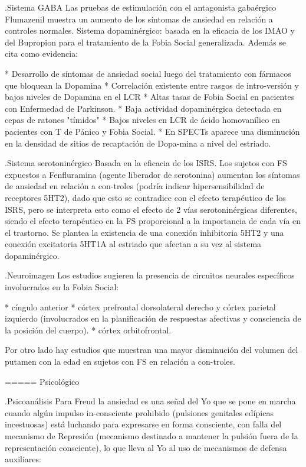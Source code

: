 \documentclass{scrbook}
\begin{document}
.Sistema GABA
Las pruebas de estimulación con el antagonista gabaérgico Flumazenil muestra un aumento de los síntomas de ansiedad en relación a controles normales. Sistema dopaminérgico: basada en la eficacia de los IMAO y del Bupropion para el tratamiento de la Fobia Social generalizada. Además se cita como evidencia:

* Desarrollo de síntomas de ansiedad social luego del tratamiento con fármacos que bloquean la Dopamina
* Correlación existente entre rasgos de intro-versión y bajos niveles de Dopamina en el LCR
* Altas tasas de Fobia Social en pacientes con Enfermedad de Parkinson.
* Baja actividad dopaminérgica detectada en cepas de ratones "tímidos"
* Bajos niveles en LCR de ácido homovanílico en pacientes con T de Pánico y Fobia Social.
* En SPECTs aparece una disminución en la densidad de sitios de recaptación de Dopa-mina a nivel del estriado.

.Sistema serotoninérgico
Basada en la eficacia de los ISRS. Los sujetos con FS expuestos a Fenfluramina (agente liberador de serotonina) aumentan los síntomas de ansiedad en relación a con-troles (podría indicar hipersensibilidad de receptores 5HT2), dado que esto se contradice con el efecto terapéutico de los ISRS, pero se interpreta esto como el efecto de 2 vías serotoninérgicas diferentes, siendo el efecto terapéutico en la FS proporcional a la importancia de cada vía en el trastorno. Se plantea la existencia de una conexión inhibitoria 5HT2 y una conexión excitatoria 5HT1A al estriado que afectan a su vez al sistema dopaminérgico.

.Neuroimagen
Los estudios sugieren la presencia de circuitos neurales específicos involucrados en la Fobia Social:

* cíngulo anterior
* córtex prefrontal dorsolateral derecho y córtex parietal izquierdo (involucrados en la planificación de respuestas afectivas y consciencia de la posición del cuerpo).
* córtex orbitofrontal.

Por otro lado hay estudios que muestran una mayor disminución del volumen del putamen con la edad en sujetos con FS en relación a con-troles.

===== Psicológico

.Psicoanálisis
Para Freud la ansiedad es una señal del Yo que se pone en marcha cuando algún impulso in-consciente prohibido (pulsiones genitales edípicas incestuosas) está luchando para expresarse en forma consciente, con falla del mecanismo de Represión (mecanismo destinado a mantener la pulsión fuera de la representación consciente), lo que lleva al Yo al uso de mecanismos de defensa auxiliares:
\end{document}
